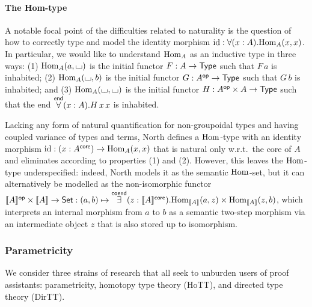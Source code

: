 \documentclass{lmcs} %
\theoremstyle{plain}\newtheorem{satz}[thm]{Satz} %
\theoremstyle{plain}
\theoremstyle{definition}
\begin{document}
\paragraph{The Hom-type}
A notable focal point of the difficulties related to naturality is the question of how to correctly type and model the identity morphism $\mathrm{id}: \forall(x : A).{\mathrm{Hom}}_A(x, x)$.
In particular, we would like to understand ${\mathrm{Hom}}_A$ as an inductive type in three ways: (1) ${\mathrm{Hom}}_A(a, {\llcorner\hspace{-.4ex}\lrcorner})$ is the initial functor $F : A \to {\mathsf{Type}}$ such that $F\,a$ is inhabited; (2) ${\mathrm{Hom}}_A({\llcorner\hspace{-.4ex}\lrcorner}, b)$ is the initial functor $G : A^{\mathsf{op}} \to {\mathsf{Type}}$ such that $G\,b$ is inhabited; and (3) ${\mathrm{Hom}}_A({\llcorner\hspace{-.4ex}\lrcorner}, {\llcorner\hspace{-.4ex}\lrcorner})$ is the initial functor $H : A^{\mathsf{op}} \times A \to {\mathsf{Type}}$ such that the end $\overset{\mathsf{end}}{\forall}(x : A).H\,x\,x$ is inhabited.

Lacking any form of natural quantification for non-groupoidal types and having coupled variance of types and terms, North \cite{north-dirhott} defines a ${\mathrm{Hom}}$-type with an identity morphism $\mathrm{id} : (x : A^{\mathsf{core}}) \to {\mathrm{Hom}}_A(x, x)$ that is natural only w.r.t.\ the core of $A$ and eliminates according to properties (1) and (2).
However, this leaves the ${\mathrm{Hom}}$-type underspecified:
indeed, North models it as the semantic ${\mathrm{Hom}}$-set, but it can alternatively be modelled as the non-isomorphic functor $\mathopen{}\left\llbracket A \right\rrbracket\mathclose{}^{\mathsf{op}} \times \mathopen{}\left\llbracket A \right\rrbracket\mathclose{} \to {\mathsf{Set}} : (a, b) \mapsto \overset{\mathsf{coend}}{\exists}(z : \mathopen{}\left\llbracket A \right\rrbracket\mathclose{}^{\mathsf{core}}).{\mathrm{Hom}}_{\mathopen{}\left\llbracket A \right\rrbracket\mathclose{}}(a, z) \times {\mathrm{Hom}}_{\mathopen{}\left\llbracket A \right\rrbracket\mathclose{}}(z, b)$,
which interprets an internal morphism from $a$ to $b$ as a semantic two-step morphism via an intermediate object $z$ that is also stored up to isomorphism.


\subsubsection{Parametricity}\label{sec:intro:param}


We consider three strains of research that all seek to unburden users of proof assistants: parametricity, homotopy type theory (HoTT), and directed type theory (DirTT).
\end{document}
